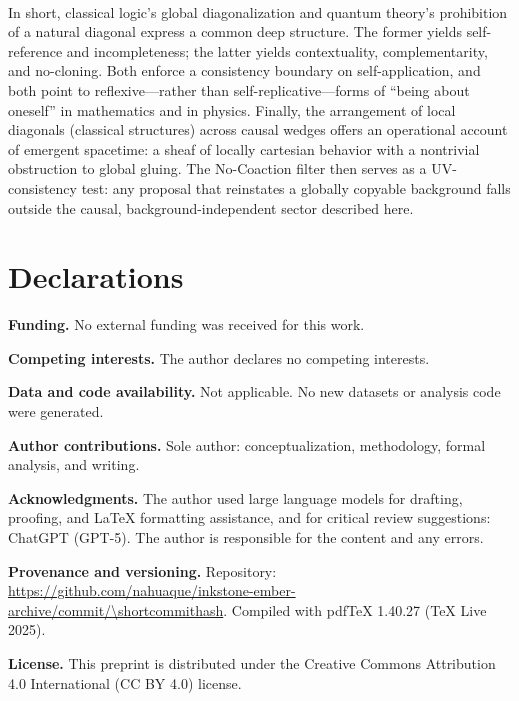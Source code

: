 \documentclass[11pt]{article}
\theoremstyle{upright}
\newcommand{\commiturl}{\url{https://github.com/nahuaque/inkstone-ember-archive/commit/\shortcommithash}}
\begin{document}
\paragraph{}
In short, classical logic’s global diagonalization and quantum theory’s prohibition of a natural diagonal express a common deep structure. The former yields self-reference and incompleteness; the latter yields contextuality, complementarity, and no-cloning. Both enforce a consistency boundary on self-application, and both point to reflexive---rather than self-replicative---forms of ``being about oneself'' in mathematics and in physics. Finally, the arrangement of local diagonals (classical structures) across causal wedges offers an operational account of emergent spacetime: a sheaf of locally cartesian behavior with a nontrivial obstruction to global gluing. The No-Coaction filter then serves as a UV-consistency test: any proposal that reinstates a globally copyable background falls outside the causal, background-independent sector described here.

\section*{Declarations}

\noindent\textbf{Funding.}
No external funding was received for this work.

\medskip
\noindent\textbf{Competing interests.}
The author declares no competing interests.

\medskip
\noindent\textbf{Data and code availability.}
Not applicable. No new datasets or analysis code were generated.

\medskip
\noindent\textbf{Author contributions.}
Sole author: conceptualization, methodology, formal analysis, and writing.

\medskip
\noindent\textbf{Acknowledgments.}
The author used large language models for drafting, proofing, and \LaTeX{} formatting assistance, and for critical review suggestions: ChatGPT (GPT-5). The author is responsible for the content and any errors.

\medskip
\noindent\textbf{Provenance and versioning.}
Repository:\\ \commiturl. 
Compiled with pdf\TeX{} 1.40.27 (TeX Live 2025). 

\medskip
\noindent\textbf{License.}
This preprint is distributed under the Creative Commons Attribution 4.0 International (CC BY 4.0) license.




\end{document}
